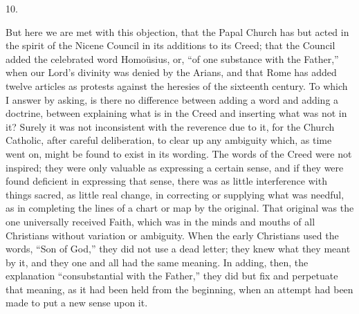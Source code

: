 10.

But here we are met with this objection, that the Papal Church has
but acted in the spirit of the Nicene Council in its additions to its
Creed; that the Council added the celebrated word Homoüsius, or,
``of one substance with the Father,'' when our Lord's divinity
was denied by the Arians, and that Rome has added twelve articles as
protests against the heresies of the sixteenth century. To which I
answer by asking, is there no difference between adding a word and
adding a doctrine, between explaining what is in the Creed and
inserting what was not in it? Surely it was not inconsistent with the
reverence due to it, for the Church Catholic, after careful
deliberation, to clear up any ambiguity which, as time went on, might
be found to exist in its wording. The words of the Creed were not
inspired; they were only valuable as expressing a certain sense, and
if they were found deficient in expressing that sense, there was as
little interference with things sacred, as little real change, in
correcting or supplying what was needful, as in completing the lines
of a chart or map by the original. That original was the one
universally received Faith, which was in the minds and mouths of all
Christians without variation or ambiguity. When the early Christians
used the words, ``Son of God,'' they did not use a dead
letter; they knew what they meant by it, and they one and all had the
same meaning. In adding, then, the explanation ``consubstantial
with the Father,'' they did but fix and perpetuate that meaning,
as it had been held from the beginning, when an attempt had been made
to put a new sense upon it.

